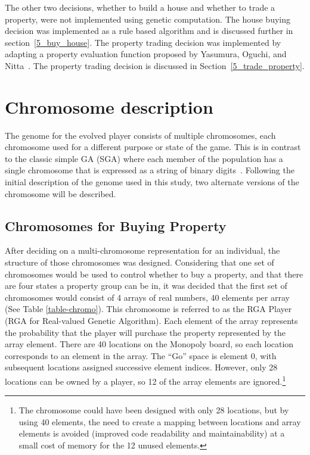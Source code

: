 The other two decisions, whether to build a house and whether to trade a
property, were not implemented using genetic computation. The house buying
decision was implemented as a rule based algorithm and is discussed further in
section~\ref{5_buy_house}. The property trading decision was implemented by
adapting a property evaluation function proposed by Yasumura, Oguchi, and
Nitta~\cite{Yasumura2001Negotiate}. The property trading decision is discussed in
Section~\ref{5_trade_property}.

\section{Chromosome description} \label{5_chromo}

The genome for the evolved player consists of multiple chromosomes, each
chromosome used for a different purpose or state of the game. This is in
contrast to the classic simple GA (SGA) where each member of the population has
a single chromosome that is expressed as a string of binary
digits~\cite{haupt2004practical}. Following the initial description of the
genome used in this study, two alternate versions of the chromosome will be
described.

\subsection{Chromosomes for Buying Property}

After deciding on a multi-chromosome representation for an individual, the
structure of those chromosomes was designed. Considering that one set of
chromosomes would be used to control whether to buy a property, and that there
are four states a property group can be in, it was decided that the first set of
chromosomes would consist of 4 arrays of real numbers, 40 elements per array
(See Table \ref{table-chromo}). This chromosome is referred to as the RGA Player
(RGA for Real-valued Genetic Algorithm). Each element of the array represents
the probability that the player will purchase the property represented by the
array element. There are 40 locations on the Monopoly board, so each location
corresponds to an element in the array. The ``Go'' space is element 0, with
subsequent locations assigned successive element indices.
However, only 28 locations can be owned by a player, so 12 of the array elements
are ignored.\footnote{The chromosome could have been designed with only 28
locations, but by using 40 elements, the need to create a mapping between
locations and array elements is avoided (improved code readability and
maintainability) at a small cost of memory for the 12 unused elements.}

